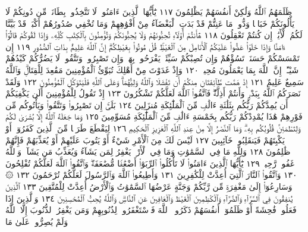 ظَلَمَهُمُ ٱللَّهُ وَلَٰكِنْ أَنفُسَهُمْ يَظْلِمُونَ ١١٧ يَٰٓأَيُّهَا ٱلَّذِينَ
ءَامَنُوا۟ لَا تَتَّخِذُوا۟ بِطَانَةࣰ مِّن دُونِكُمْ لَا يَأْلُونَكُمْ خَبَالࣰا
وَدُّوا۟ مَا عَنِتُّمْ قَدْ بَدَتِ ٱلْبَغْضَآءُ مِنْ أَفْوَٰهِهِمْ وَمَا تُخْفِي
صُدُورُهُمْ أَكْبَرُۚ قَدْ بَيَّنَّا لَكُمُ ٱلْأٓيَٰتِۖ إِن كُنتُمْ تَعْقِلُونَ ١١٨
هَٰٓأَنتُمْ أُو۟لَآءِ تُحِبُّونَهُمْ وَلَا يُحِبُّونَكُمْ وَتُؤْمِنُونَ بِٱلْكِتَٰبِ
كُلِّهِۦ وَإِذَا لَقُوكُمْ قَالُوٓا۟ ءَامَنَّا وَإِذَا خَلَوْا۟ عَضُّوا۟ عَلَيْكُمُ
ٱلْأَنَامِلَ مِنَ ٱلْغَيْظِۚ قُلْ مُوتُوا۟ بِغَيْظِكُمْۗ إِنَّ ٱللَّهَ عَلِيمُۢ بِذَاتِ
ٱلصُّدُورِ ١١٩ إِن تَمْسَسْكُمْ حَسَنَةࣱ تَسُؤْهُمْ وَإِن تُصِبْكُمْ
سَيِّئَةࣱ يَفْرَحُوا۟ بِهَاۖ وَإِن تَصْبِرُوا۟ وَتَتَّقُوا۟ لَا يَضُرُّكُمْ كَيْدُهُمْ
شَيْـًٔاۗ إِنَّ ٱللَّهَ بِمَا يَعْمَلُونَ مُحِيطࣱ ١٢٠ وَإِذْ غَدَوْتَ مِنْ أَهْلِكَ
تُبَوِّئُ ٱلْمُؤْمِنِينَ مَقَٰعِدَ لِلْقِتَالِۗ وَٱللَّهُ سَمِيعٌ عَلِيمٌ ١٢١
إِذْ هَمَّت طَّآئِفَتَانِ مِنكُمْ أَن تَفْشَلَا وَٱللَّهُ وَلِيُّهُمَاۗ وَعَلَى ٱللَّهِ
فَلْيَتَوَكَّلِ ٱلْمُؤْمِنُونَ ١٢٢ وَلَقَدْ نَصَرَكُمُ ٱللَّهُ بِبَدْرࣲ وَأَنتُمْ أَذِلَّةࣱۖ
فَٱتَّقُوا۟ ٱللَّهَ لَعَلَّكُمْ تَشْكُرُونَ ١٢٣ إِذْ تَقُولُ لِلْمُؤْمِنِينَ
أَلَن يَكْفِيَكُمْ أَن يُمِدَّكُمْ رَبُّكُم بِثَلَٰثَةِ ءَالَٰفࣲ مِّنَ ٱلْمَلَٰٓئِكَةِ
مُنزَلِينَ ١٢٤ بَلَىٰٓۚ إِن تَصْبِرُوا۟ وَتَتَّقُوا۟ وَيَأْتُوكُم مِّن فَوْرِهِمْ
هَٰذَا يُمْدِدْكُمْ رَبُّكُم بِخَمْسَةِ ءَالَٰفࣲ مِّنَ ٱلْمَلَٰٓئِكَةِ مُسَوِّمِينَ ١٢٥
وَمَا جَعَلَهُ ٱللَّهُ إِلَّا بُشْرَىٰ لَكُمْ وَلِتَطْمَئِنَّ قُلُوبُكُم بِهِۦۗ
وَمَا ٱلنَّصْرُ إِلَّا مِنْ عِندِ ٱللَّهِ ٱلْعَزِيزِ ٱلْحَكِيمِ ١٢٦ لِيَقْطَعَ طَرَفࣰا
مِّنَ ٱلَّذِينَ كَفَرُوٓا۟ أَوْ يَكْبِتَهُمْ فَيَنقَلِبُوا۟ خَآئِبِينَ ١٢٧
لَيْسَ لَكَ مِنَ ٱلْأَمْرِ شَيْءٌ أَوْ يَتُوبَ عَلَيْهِمْ أَوْ يُعَذِّبَهُمْ فَإِنَّهُمْ
ظَٰلِمُونَ ١٢٨ وَلِلَّهِ مَا فِي ٱلسَّمَٰوَٰتِ وَمَا فِي ٱلْأَرْضِۚ يَغْفِرُ لِمَن
يَشَآءُ وَيُعَذِّبُ مَن يَشَآءُۚ وَٱللَّهُ غَفُورࣱ رَّحِيمࣱ ١٢٩ يَٰٓأَيُّهَا
ٱلَّذِينَ ءَامَنُوا۟ لَا تَأْكُلُوا۟ ٱلرِّبَوٰٓا۟ أَضْعَٰفࣰا مُّضَٰعَفَةࣰۖ
وَٱتَّقُوا۟ ٱللَّهَ لَعَلَّكُمْ تُفْلِحُونَ ١٣٠ وَٱتَّقُوا۟ ٱلنَّارَ ٱلَّتِيٓ أُعِدَّتْ
لِلْكَٰفِرِينَ ١٣١ وَأَطِيعُوا۟ ٱللَّهَ وَٱلرَّسُولَ لَعَلَّكُمْ تُرْحَمُونَ ١٣٢
۞ وَسَارِعُوٓا۟ إِلَىٰ مَغْفِرَةࣲ مِّن رَّبِّكُمْ وَجَنَّةٍ عَرْضُهَا
ٱلسَّمَٰوَٰتُ وَٱلْأَرْضُ أُعِدَّتْ لِلْمُتَّقِينَ ١٣٣ ٱلَّذِينَ يُنفِقُونَ
فِي ٱلسَّرَّآءِ وَٱلضَّرَّآءِ وَٱلْكَٰظِمِينَ ٱلْغَيْظَ وَٱلْعَافِينَ
عَنِ ٱلنَّاسِۗ وَٱللَّهُ يُحِبُّ ٱلْمُحْسِنِينَ ١٣٤ وَٱلَّذِينَ إِذَا فَعَلُوا۟
فَٰحِشَةً أَوْ ظَلَمُوٓا۟ أَنفُسَهُمْ ذَكَرُوا۟ ٱللَّهَ فَٱسْتَغْفَرُوا۟
لِذُنُوبِهِمْ وَمَن يَغْفِرُ ٱلذُّنُوبَ إِلَّا ٱللَّهُ وَلَمْ يُصِرُّوا۟ عَلَىٰ مَا
